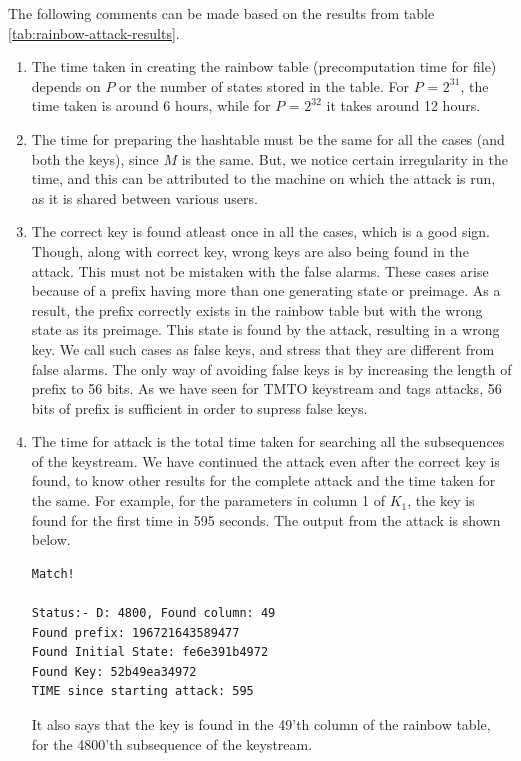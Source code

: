 The following comments can be made based on the results from table \ref{tab:rainbow-attack-results}.
\begin{enumerate}
\item The time taken in creating the rainbow table (precomputation time for file) depends on $P$ or the number of states stored in the table. For $P$ = $2^{31}$, the time taken is around 6 hours, while for $P$ = $2^{32}$ it takes around 12 hours. 

\item The time for preparing the hashtable must be the same for all the cases (and both the keys), since $M$ is the same. But, we notice certain irregularity in the time, and this can be attributed to the machine on which the attack is run, as it is shared between various users. 

\item The correct key is found atleast once in all the cases, which is a good sign. Though, along with correct key, wrong keys are also being found in the attack. This must not be mistaken with the false alarms. These cases arise because of a prefix having more than one generating state or preimage. As a result, the prefix correctly exists in the rainbow table but with the wrong state as its preimage. This state is found by the attack, resulting in a wrong key. We call such cases as false keys, and stress that they are different from false alarms. The only way of avoiding false keys is by increasing the length of prefix to 56 bits. As we have seen for TMTO keystream and tags attacks, 56 bits of prefix is sufficient in order to supress false keys. 

\item The time for attack is the total time taken for searching all the subsequences of the keystream. We have continued the attack even after the correct key is found, to know other results for the complete attack and the time taken for the same. For example, for the parameters in column 1 of $K_1$, the key is found for the first time in 595 seconds. The output from the attack is shown below.

\begin{lstlisting}[frame=tb]
Match!

Status:- D: 4800, Found column: 49
Found prefix: 196721643589477
Found Initial State: fe6e391b4972
Found Key: 52b49ea34972
TIME since starting attack: 595
\end{lstlisting}

It also says that the key is found in the 49'th column of the rainbow table, for the 4800'th subsequence of the keystream. 
\end{enumerate}


